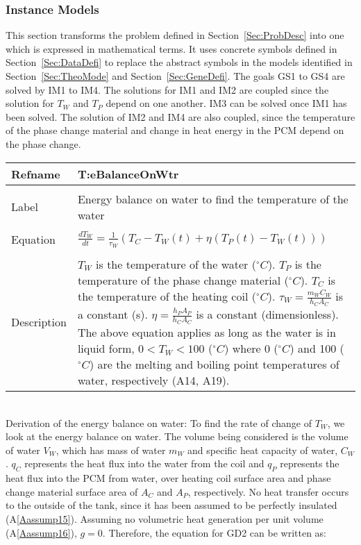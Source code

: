 \documentclass[12pt]{article}
\begin{document}
\subsubsection{Instance Models}
\label{Sec:InstMode}
This section transforms the problem defined in Section~\ref{Sec:ProbDesc} into one which is expressed in mathematical terms. It uses concrete symbols defined in Section~\ref{Sec:DataDefi} to replace the abstract symbols in the models identified in Section~\ref{Sec:TheoMode} and Section~\ref{Sec:GeneDefi}.
The goals GS1 to GS4 are solved by IM1 to IM4. The solutions for IM1 and IM2 are coupled since the solution for $T_{W}$ and $T_{P}$ depend on one another. IM3 can be solved once IM1 has been solved. The solution of IM2 and IM4 are also coupled, since the temperature of the phase change material and change in heat energy in the PCM depend on the phase change.
~\newline
\noindent \begin{minipage}{\textwidth}
\begin{tabular}{p{} p{}}
\toprule \textbf{Refname} & \textbf{T:eBalanceOnWtr}
\label{T:eBalanceOnWtr}
\\ \midrule \\
Label & Energy balance on water to find the temperature of the water
\\ \midrule \\
Equation & $\frac{dT_{W}}{dt}=\frac{1}{\tau{}_{W}}\left(T_{C}-T_{W}\left(t\right)+\eta{}\left(T_{P}\left(t\right)-T_{W}\left(t\right)\right)\right)$
\\ \midrule \\
Description & $T_{W}$ is the temperature of the water (${}^{\circ}C$). $T_{P}$ is the temperature of the phase change material (${}^{\circ}C$). $T_{C}$ is the temperature of the heating coil (${}^{\circ}C$). $\tau{}_{W}=\frac{m_{W}C_{W}}{h_{C}A_{C}}$ is a constant (s). $\eta{}=\frac{h_{P}A_{P}}{h_{C}A_{C}}$ is a constant (dimensionless). The above equation applies as long as the water is in liquid form, $0<T_{W}<100$ (${}^{\circ}C$) where 0 (${}^{\circ}C$) and 100 (${}^{\circ}C$) are the melting and boiling point temperatures of water, respectively (A14, A19).
\\ \bottomrule \end{tabular}
\end{minipage}\\
Derivation of the energy balance on water:
To find the rate of change of $T_{W}$, we look at the energy balance on water. The volume being considered is the volume of water $V_{W}$, which has mass of water $m_{W}$ and specific heat capacity of water, $C_{W}$. $q_{C}$ represents the heat flux into the water from the coil and $q_{P}$ represents the heat flux into the PCM from water, over heating coil surface area and phase change material surface area of $A_{C}$ and $A_{P}$, respectively. No heat transfer occurs to the outside of the tank, since it has been assumed to be perfectly insulated (A\ref{Aassump15}). Assuming no volumetric heat generation per unit volume (A\ref{Aassump16}), $g=0$. Therefore, the equation for GD2 can be written as:
\end{document}
